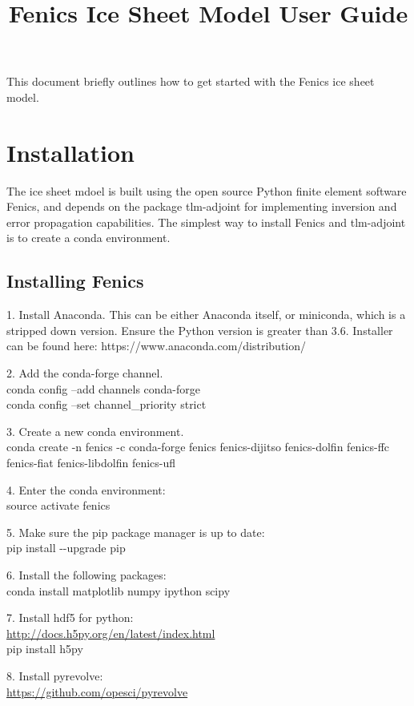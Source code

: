 \documentclass[11pt, reqno, nocenter]{article}
\title{Fenics Ice Sheet Model User Guide}
\begin{document}
\maketitle

This document briefly outlines how to get started with the Fenics ice sheet model. 

\tableofcontents 
\section{Installation}

The ice sheet mdoel is built using the open source Python finite element software Fenics, and depends on the package tlm-adjoint for implementing inversion and error propagation capabilities. The simplest way to install Fenics and tlm-adjoint is to create a conda environment. 

\subsection{Installing Fenics}
 
1. Install Anaconda. This can be either Anaconda itself, or miniconda, which is a stripped down version. Ensure the Python version is greater than 3.6. Installer can be found here: https://www.anaconda.com/distribution/ 

2. Add the conda-forge channel. \\
conda config --add channels conda-forge \\
conda config --set channel\_priority strict

3. Create a new conda environment. \\
conda create -n fenics -c conda-forge fenics fenics-dijitso fenics-dolfin fenics-ffc fenics-fiat fenics-libdolfin fenics-ufl

4. Enter the conda environment: \\
source activate fenics

5. Make sure the pip package manager is up to date: \\
pip install -{}-upgrade pip

6. Install the following packages: \\
conda install matplotlib numpy ipython scipy 

7. Install hdf5 for python: \\
\url{http://docs.h5py.org/en/latest/index.html} \\
pip install h5py

8. Install pyrevolve: \\
\url{https://github.com/opesci/pyrevolve}
\end{document}
